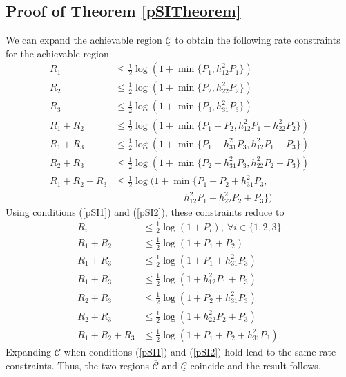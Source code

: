 \documentclass[10pt,conference]{IEEEtran}
\begin{document}
\begin{appendices}
\section{Proof of Theorem \ref{pSITheorem}}
\label{pSIProof}
We can expand the achievable region $\underline{\mathcal{C}}$
to obtain the following rate constraints for the achievable region
\begin{align*}
R_1&\leq\frac{1}{2}\log(1+\min\{P_1,h_{12}^2P_1\})\\
R_2&\leq\frac{1}{2}\log(1+\min\{P_2,h_{22}^2P_2\})\\
R_3&\leq\frac{1}{2}\log(1+\min\{P_3,h_{31}^2P_3\})\\
R_1+R_2&\leq\frac{1}{2}\log(1+\min\{P_1+P_2,h_{12}^2P_1+h_{22}^2P_2\})\\
R_1+R_3&\leq\frac{1}{2}\log(1+\min\{P_1+h_{31}^2P_3,h_{12}^2P_1+P_3\})\\
R_2+R_3&\leq\frac{1}{2}\log(1+\min\{P_2+h_{31}^2P_3,h_{22}^2P_2+P_3\})\\
R_1+R_2+R_3&\leq\frac{1}{2}\log(1+\min\{P_1+P_2+h_{31}^2P_3,\\
&\hspace{3cm}h_{12}^2P_1+h_{22}^2P_2+P_3\})
\end{align*}
Using conditions (\ref{pSI1}) and (\ref{pSI2}), these constraints reduce to
\begin{align*}
R_i&\leq\frac{1}{2}\log(1+P_i),\ \forall i\in\{1,2,3\}\\
R_1+R_2&\leq\frac{1}{2}\log(1+P_1+P_2)\\
R_1+R_3&\leq\frac{1}{2}\log(1+P_1+h_{31}^2P_3)\\
R_1+R_3&\leq\frac{1}{2}\log(1+h_{12}^2P_1+P_3)\\
R_2+R_3&\leq\frac{1}{2}\log(1+P_2+h_{31}^2P_3)\\
R_2+R_3&\leq\frac{1}{2}\log(1+h_{22}^2P_2+P_3)\\
R_1+R_2+R_3&\leq\frac{1}{2}\log(1+P_1+P_2+h_{31}^2P_3).
\end{align*}
Expanding $\overline{\mathcal{C}}$ when conditions (\ref{pSI1}) and (\ref{pSI2}) hold lead to the same rate constraints. Thus, the two regions $\overline{\mathcal{C}}$ and $\underline{\mathcal{C}}$ coincide and the result follows.





\end{appendices}
\end{document}
